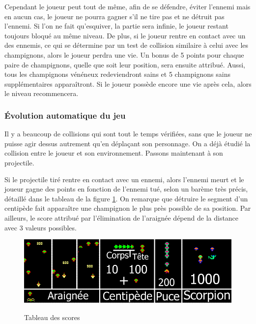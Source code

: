 
Cependant le joueur peut tout de même, afin de se défendre, éviter l'ennemi mais en aucun cas, le joueur ne pourra gagner s'il ne tire pas et ne détruit pas l'ennemi. Si l'on ne fait qu'esquiver, la partie sera infinie, le joueur restant toujours bloqué au même niveau. De plus, si le joueur rentre en contact avec un des ennemis, ce qui se détermine par un test de collision similaire à celui avec les champignons, alors le joueur perdra une vie. Un bonus de 5 points pour chaque paire de champignons, quelle que soit leur position, sera ensuite attribué. Aussi, tous les champignons vénéneux redeviendront sains et 5 champignons sains supplémentaires apparaîtront. Si le joueur possède encore une vie après cela, alors le niveau recommencera. 

\subsubsection{Évolution automatique du jeu}

Il y a beaucoup de collisions qui sont tout le temps vérifiées, sans que le joueur ne puisse agir dessus autrement qu'en déplaçant son personnage. On a déjà étudié la collision entre le joueur et son environnement. Passons maintenant à son projectile.

Si le projectile tiré rentre en contact avec un ennemi, alors l'ennemi meurt et le joueur gagne des points en fonction de l'ennemi tué, selon un barème très précis, détaillé dans le tableau de la figure \ref{fig:ScoresCenti}. On remarque que détruire le segment d'un centipède fait apparaître une champignon le plus près possible de sa position. Par ailleurs, le score attribué par l'élimination de l'araignée dépend de la distance avec 3 valeurs possibles.

\begin{figure}[ht]%
\center
\caption{Tableau des scores}%
\smallskip
\includegraphics[width=\textwidth]{imgs/scoresCentipede.png}%
\label{fig:ScoresCenti}%
\end{figure}

